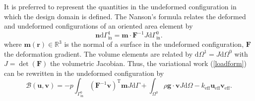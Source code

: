 \documentclass[journal]{IEEEtran}
\renewcommand{\vec}[1]{\mathbf{#1}}
\theoremstyle{definition}
\renewcommand{\vec}[1]{\mathbf{#1}}
\begin{document}
It is preferred to represent the quantities in the undeformed configuration in which the design domain is defined. The Nanson's formula relates the deformed and undeformed configurations of an oriented area element by
\begin{equation}
  \vec{n}  \mathrm{d} \Gamma_{\text{in}}^{1} = \vec{m} \cdot \vec{F}^{-1} J \mathrm{d} \Gamma_{\text{in}}^{0}.
\end{equation}
where $\vec{m}(\vec{r})\in\mathbb{R}^3$ is the normal of a surface in the undeformed configuration, $\vec{F}$ the deformation gradient. The volume elements are related by $\mathrm{d}\Omega^{1}=J\mathrm{d}\Omega^{0}$ with $J =\det  (  \vec{F}  ) $ the volumetric Jacobian. Thus, the variational work (\ref{loadform}) can be rewritten in the undeformed configuration by
\begin{equation}
  \mathcal{B}(\vec{u}, \vec{v})=-p \int_{\Gamma_{\text{in}}^{0}} (\vec{F}^{-1}\vec{v})^\text{T} \vec{m} J \mathrm{d} \Gamma
  +\int_{\Omega^{0}} \rho\mathbf{g}\cdot\mathbf{v}J\mathrm{d}\Omega - k_\text{eff}\vec{u}_\text{eff}\vec{v}_\text{eff}.
\end{equation}
\end{document}
